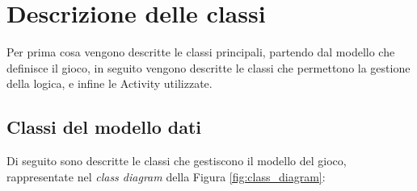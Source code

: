 \renewcommand*{\mypath}{trovaintruso1}%
\graphicspath{ {\mypath/images/} }

\localtoc

\section{Descrizione delle classi}

\noindent Per prima cosa vengono descritte le classi principali, partendo dal modello che definisce il gioco, in seguito vengono descritte le classi  che permettono la gestione della logica, e infine le Activity utilizzate.

\subsection{Classi del modello dati}

\noindent Di seguito sono descritte le classi che gestiscono il modello del gioco, rappresentate nel \textit{class diagram} della Figura \ref{fig:class_diagram}:

